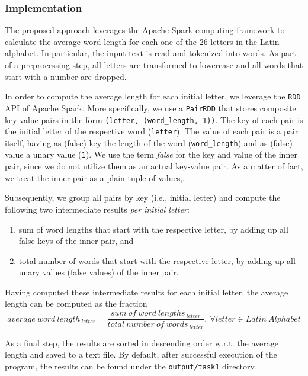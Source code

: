 \documentclass[acmlarge]{acmart}
\begin{document}
\subsubsection{Implementation}
The proposed approach leverages the Apache Spark computing framework to calculate the average word length for each one of the 26 letters in the Latin alphabet. In particular, the input text is read and tokenized into words. As part of a preprocessing step, all letters are transformed to lowercase and all words that start with a number are dropped.

In order to compute the average length for each initial letter, we leverage the \texttt{RDD} API of Apache Spark. More specifically, we use a \texttt{PairRDD} that stores composite key-value pairs in the form \texttt{(letter, (word\_length, 1))}. The key of each pair is the initial letter of the respective word (\texttt{letter}). The value of each pair is a pair itself, having as (false) key the length of the word (\texttt{word\_length}) and as (false) value a unary value (\texttt{1}). We use the term \emph{false} for the key and value of the inner pair, since we do not utilize them as an actual key-value pair. As a matter of fact, we treat the inner pair as a plain tuple of values,.

Subsequently, we group all pairs by key (i.e., initial letter) and compute the following two intermediate results \emph{per initial letter}:
\begin{enumerate}
  \item sum of word lengths that start with the respective letter, by adding up all false keys of the inner pair, and
  \item total number of words that start with the respective letter, by adding up all unary values (false values) of the inner pair.
\end{enumerate}

Having computed these intermediate results for each initial letter, the average length can be computed as the fraction
\begin{displaymath}
  average~word~length_{~letter} = \frac{sum~of~word~lengths_{~letter}}{total~number~of~words_{~letter}},~ \forall letter \in Latin~Alphabet
\end{displaymath}

As a final step, the results are sorted in descending order w.r.t. the average length and saved to a text file. By default, after successful execution of the program, the results can be found under the \texttt{output/task1} directory.
\end{document}
